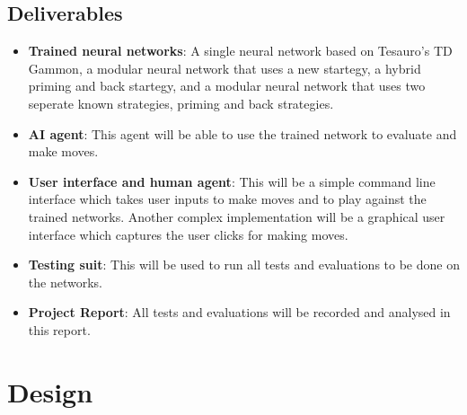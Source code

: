 \documentclass[12pt,a4paper]{article}
\begin{document}
\subsection{Deliverables}
\begin{itemize}
    \item \textbf{Trained neural networks}: A single neural network based on Tesauro's TD Gammon, a modular neural network that uses a new startegy, a hybrid priming and back startegy, and a modular neural network that uses two seperate known strategies, priming and back strategies.
    \item \textbf{AI agent}: This agent will be able to use the trained network to evaluate and make moves.
    \item \textbf{User interface and human agent}: This will be a simple command line interface which takes user inputs to make moves and to play against the trained networks. Another complex implementation will be a graphical user interface which captures the user clicks for making moves.
    \item \textbf{Testing suit}: This will be used to run all tests and evaluations to be done on the networks.
    \item \textbf{Project Report}: All tests and evaluations will be recorded and analysed in this report.
\end{itemize}

\pagebreak

\section{Design}
\end{document}
